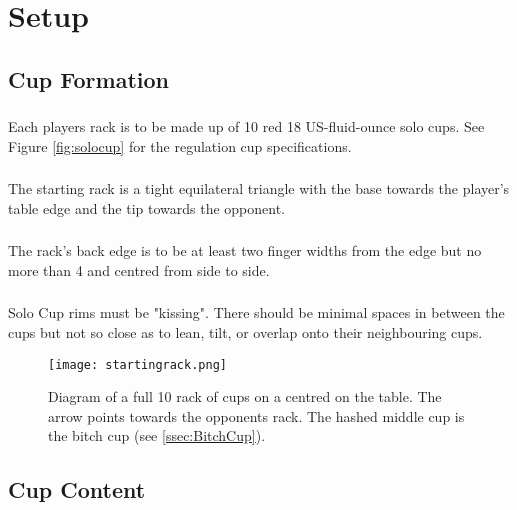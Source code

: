 \section{Setup}\label{sec:SETUP}

	\subsection{Cup Formation}\label{ssec:CupFormation}
		\subsubsection{} \label{sssec:CF,solocups}
			Each players rack is to be made up of 10 red 18 US-fluid-ounce solo cups.
            See Figure \ref{fig:solocup} for the regulation cup specifications.
		\subsubsection{}  \label{sssec:CF,triangle}
			The starting rack is a tight equilateral triangle with the base towards the player's table edge and the tip towards the opponent.
		\subsubsection{}  \label{sssec:CF,position}
			The rack's back edge is to be at least two finger widths from the edge but no more than 4 and centred from side to side.
		\subsubsection{}  \label{sssec:CF,kissing}
			Solo Cup rims must be "kissing". There should be minimal spaces in between the cups but not so close as to lean, tilt, or overlap onto their neighbouring cups.
			
	\begin{figure}[h]%
		\centering
		\texttt{[image: startingrack.png]}
		\caption{Diagram of a full 10 rack of cups on a centred on the table. The arrow points towards the opponents rack. The hashed middle cup is the bitch cup (see \ref{ssec:BitchCup}).}
		\label{fig:therack}
	\end{figure}

	\subsection{Cup Content}\label{ssec:CupContent}

